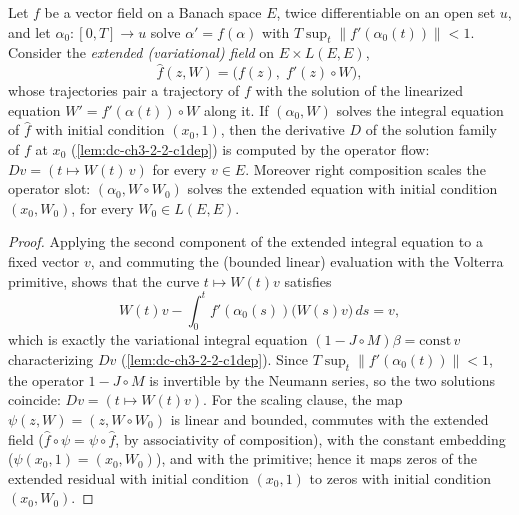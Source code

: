 \begin{lemma}
  \label{lem:dc-ch3-2-2-variational}
  \leanok
  Let $f$ be a vector field on a Banach space $E$, twice differentiable on an
  open set $u$, and let $\alpha_0 : [0,T] \to u$ solve $\alpha' = f(\alpha)$
  with $T \sup_t \|f'(\alpha_0(t))\| < 1$. Consider the \emph{extended
  (variational) field} on $E \times L(E,E)$,
  $$\hat f(z, W) = \big(f(z),\; f'(z) \circ W\big),$$
  whose trajectories pair a trajectory of $f$ with the solution of the
  linearized equation $W' = f'(\alpha(t)) \circ W$ along it. If $(\alpha_0, W)$
  solves the integral equation of $\hat f$ with initial condition $(x_0, 1)$,
  then the derivative $D$ of the solution family of $f$ at $x_0$
  (\cref{lem:dc-ch3-2-2-c1dep}) is computed by the operator flow:
  $Dv = (t \mapsto W(t)\,v)$ for every $v \in E$. Moreover right composition
  scales the operator slot: $(\alpha_0, W \circ W_0)$ solves the extended
  equation with initial condition $(x_0, W_0)$, for every $W_0 \in L(E,E)$.
\end{lemma}
\begin{proof}
  \sketch
  \leanok
  Applying the second component of the extended integral equation to a fixed
  vector $v$, and commuting the (bounded linear) evaluation with the Volterra
  primitive, shows that the curve $t \mapsto W(t)v$ satisfies
  $$W(t)v - \int_0^t f'(\alpha_0(s))\big(W(s)v\big)\,ds = v ,$$
  which is exactly the variational integral equation
  $(1 - J \circ M)\beta = \mathrm{const}\, v$ characterizing $Dv$
  (\cref{lem:dc-ch3-2-2-c1dep}). Since $T \sup_t \|f'(\alpha_0(t))\| < 1$, the
  operator $1 - J \circ M$ is invertible by the Neumann series, so the two
  solutions coincide: $Dv = (t \mapsto W(t)v)$. For the scaling clause, the map
  $\psi(z, W) = (z, W \circ W_0)$ is linear and bounded, commutes with the
  extended field ($\hat f \circ \psi = \psi \circ \hat f$, by associativity of
  composition), with the constant embedding ($\psi(x_0, 1) = (x_0, W_0)$), and
  with the primitive; hence it maps zeros of the extended residual with initial
  condition $(x_0, 1)$ to zeros with initial condition $(x_0, W_0)$.
\end{proof}

